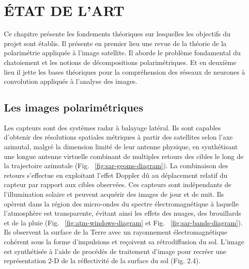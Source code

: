 \chapter{ÉTAT DE L'ART}

Ce chapitre présente les fondements théoriques sur lesquelles les objectifs du projet sont établis.  Il présente en premier lieu une revue de la théorie de la polarimétrie appliquée à l'image satellite. Il aborde le problème fondamental du chatoiement et les notions de décompositions polarimétriques.  Et en deuxième lieu il jette les bases théoriques pour la compréhension des réseaux de neurones à convolution appliqués à l'analyse des images.

\section{Les images polarimétriques}

Les capteurs \acrpolsar sont des systèmes radar à balayage latéral. Ils sont capables d’obtenir des résolutions spatiales métriques à partir des satellites selon l’axe azimutal, malgré la dimension limité de leur antenne physique, en synthétisant une longue antenne virtuelle combinant de multiples retours des cibles le long de la trajectoire azimutale (Fig. ~\ref{fig:sar-geoms-diagram}). La combinaison des retours s’effectue en exploitant l’effet Doppler dû au déplacement relatif du capteur par rapport aux cibles observées. Ces capteurs sont indépendants de l’illumination solaire et peuvent acquérir des images de jour et de nuit. Ils opèrent dans la région des micro-ondes du spectre électromagnétique à laquelle l’atmosphère est transparente, évitant ainsi les effets des nuages, des brouillards et de la pluie (Fig. ~\ref{fig:atm-windows-diagram} et Fig. ~\ref{fig:sar-bands-diagram}). Ils observent la surface de la Terre avec un rayonnement électromagnétique cohérent sous la forme d’impulsions et reçoivent sa rétrodiffusion du sol. L’image \acrsar est synthétisée à l’aide de procédés de traitement d’image pour recréer une représentation 2-D de la réflectivité de la surface du sol (Fig. 2.4).


